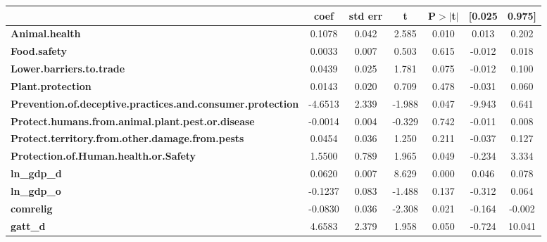 \begin{center}
\begin{tabular}{lcccccc}
                                                                   & \textbf{coef} & \textbf{std err} & \textbf{t} & \textbf{P$> |$t$|$} & \textbf{[0.025} & \textbf{0.975]}  \\
\midrule
\textbf{Animal.health}                                             &       0.1078  &        0.042     &     2.585  &         0.010        &        0.013    &        0.202     \\
\textbf{Food.safety}                                               &       0.0033  &        0.007     &     0.503  &         0.615        &       -0.012    &        0.018     \\
\textbf{Lower.barriers.to.trade}                                   &       0.0439  &        0.025     &     1.781  &         0.075        &       -0.012    &        0.100     \\
\textbf{Plant.protection}                                          &       0.0143  &        0.020     &     0.709  &         0.478        &       -0.031    &        0.060     \\
\textbf{Prevention.of.deceptive.practices.and.consumer.protection} &      -4.6513  &        2.339     &    -1.988  &         0.047        &       -9.943    &        0.641     \\
\textbf{Protect.humans.from.animal.plant.pest.or.disease}          &      -0.0014  &        0.004     &    -0.329  &         0.742        &       -0.011    &        0.008     \\
\textbf{Protect.territory.from.other.damage.from.pests}            &       0.0454  &        0.036     &     1.250  &         0.211        &       -0.037    &        0.127     \\
\textbf{Protection.of.Human.health.or.Safety}                      &       1.5500  &        0.789     &     1.965  &         0.049        &       -0.234    &        3.334     \\
\textbf{ln\_gdp\_d}                                                &       0.0620  &        0.007     &     8.629  &         0.000        &        0.046    &        0.078     \\
\textbf{ln\_gdp\_o}                                                &      -0.1237  &        0.083     &    -1.488  &         0.137        &       -0.312    &        0.064     \\
\textbf{comrelig}                                                  &      -0.0830  &        0.036     &    -2.308  &         0.021        &       -0.164    &       -0.002     \\
\textbf{gatt\_d}                                                   &       4.6583  &        2.379     &     1.958  &         0.050        &       -0.724    &       10.041     \\
\bottomrule
\end{tabular}
\end{center}